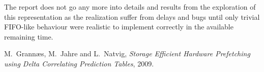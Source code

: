 \documentclass[12pt,journal,compsoc]{IEEEtran}
\begin{document}
The report does not go any more into details and results from the
exploration of this representation as the realization suffer from
delays and bugs until only trivial FIFO-like behaviour were realistic 
to implement correctly in the available remaining time.

\ifCLASSOPTIONcompsoc
\else
\fi


\ifCLASSOPTIONcaptionsoff
  \newpage
\fi



\begin{thebibliography}{1}

M.~Grann\ae s, M.~Jahre and L.~Natvig, \emph{Storage Efficient Hardware Prefetching using Delta Correlating Prediction Tables}, 2009.

\end{thebibliography}



\end{document}
